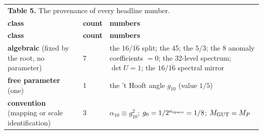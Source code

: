\documentclass[aps,prd,amsmath,amssymb,superscriptaddress,longbibliography,floatfix,preprint]{revtex4-2}
\begin{document}
{\footnotesize
\renewcommand{\arraystretch}{1.45}

\begin{longtable}{lll}
\multicolumn{3}{l}{\textbf{Table 5.} The provenance of every headline number.} \\
\addlinespace[2pt]
\toprule
\parbox[c]{3.99cm}{\vspace{2.5pt}\raggedright {} \textbf{class}\vspace{2.5pt}} & \textbf{count} & \parbox[c]{9.66cm}{\vspace{2.5pt}\raggedright {} \textbf{numbers}\vspace{2.5pt}} \\
\midrule
\endfirsthead
\toprule
\parbox[c]{3.99cm}{\vspace{2.5pt}\raggedright {} \textbf{class}\vspace{2.5pt}} & \textbf{count} & \parbox[c]{9.66cm}{\vspace{2.5pt}\raggedright {} \textbf{numbers}\vspace{2.5pt}} \\
\midrule
\endhead
\midrule
\endfoot
\bottomrule
\endlastfoot
\parbox[c]{3.99cm}{\vspace{2.5pt}\raggedright {} \textbf{algebraic} (fixed by the root, no parameter)\vspace{2.5pt}} & 7 & \parbox[c]{9.66cm}{\vspace{2.5pt}\raggedright {} the \mbox{$16/\overline{16}$} split; the 45; the \mbox{$5/3$}; the 8 anomaly coefficients \mbox{$=0$}; the 32-level spectrum; \mbox{$\det U = 1$}; the \mbox{$16/\overline{16}$} spectral mirror\vspace{2.5pt}} \\
\hline{}
\parbox[c]{3.99cm}{\vspace{2.5pt}\raggedright {} \textbf{free parameter} (one)\vspace{2.5pt}} & 1 & \parbox[c]{9.66cm}{\vspace{2.5pt}\raggedright {} the 't Hooft angle \mbox{$g_{10}$} (value \mbox{$1/5$})\vspace{2.5pt}} \\
\hline{}
\parbox[c]{3.99cm}{\vspace{2.5pt}\raggedright {} \textbf{convention} (mapping or scale identification)\vspace{2.5pt}} & 3 & \parbox[c]{9.66cm}{\vspace{2.5pt}\raggedright {} \mbox{$\alpha_{10} \equiv g_{10}^2$}; $g_0 = 1/2^{n_{\rm space}} = 1/8$; \mbox{$M_{\rm GUT} = M_P$}\vspace{2.5pt}} \\

\end{longtable}}
\end{document}
